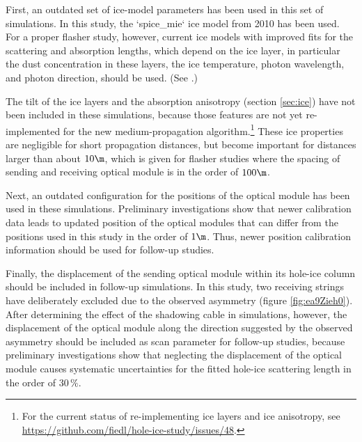 First, an outdated set of ice-model parameters has been used in this set of simulations. In this study, the `spice_mie` ice model from 2010 has been used. For a proper flasher study, however, current ice models with improved fits for the scattering and absorption lengths, which depend on the ice layer, in particular the dust concentration in these layers, the ice temperature, photon wavelength, and photon direction, should be used. (See \cite{icepaper,flasherdataderivedicemodels}.)

The tilt of the ice layers and the absorption anisotropy (section \ref{sec:ice}) have not been included in these simulations, because those features are not yet re-implemented for the new medium-propagation algorithm.\footnote{For the current status of re-implementing ice layers and ice anisotropy, see \url{https://github.com/fiedl/hole-ice-study/issues/48}.} These ice properties are negligible for short propagation distances, but become important for distances larger than about $10\m$, which is given for flasher studies where the spacing of sending and receiving optical module is in the order of $100\m$.

Next, an outdated configuration for the positions of the optical module has been used in these simulations. Preliminary investigations show that newer calibration data leads to updated position of the optical modules that can differ from the positions used in this study in the order of $1\m$. Thus, newer position calibration information should be used for follow-up studies.

Finally, the displacement of the sending optical module within its hole-ice column should be included in follow-up simulations. In this study, two receiving strings have deliberately excluded due to the observed asymmetry (figure \ref{fig:ea9Zieh0}). After determining the effect of the shadowing cable in simulations, however, the displacement of the optical module along the direction suggested by the observed asymmetry should be included as scan parameter for follow-up studies, because preliminary investigations show that neglecting the displacement of the optical module causes systematic uncertainties for the fitted hole-ice scattering length in the order of $30\,\%$.



